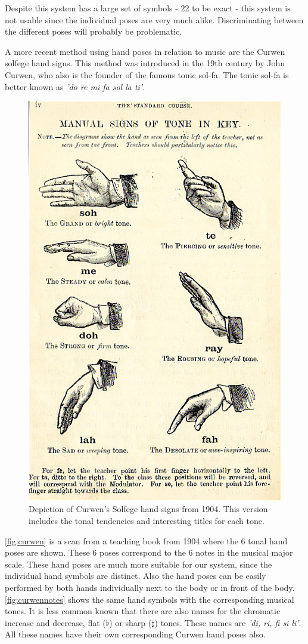 Despite this system has a large set of symbols - 22 to be exact - this system is not usable since the individual poses are very much alike. Discriminating between the different poses will probably be problematic.

A more recent method using hand poses in relation to music are the Curwen solfege hand signs\cite{choksy1999}. This method was introduced in the 19th century by John Curwen, who also is the founder of the famous tonic sol-fa. The tonic sol-fa is better known as \emph{'do re mi fa sol la ti'}.

\begin{figure}[htbp]
	\centering{}
	\includegraphics[width=0.6\linewidth]{figures/curwen.jpg}
	\caption{Depiction of Curwen's Solfege hand signs from 1904. This version includes the tonal tendencies and interesting titles for each tone.}
	\label{fig:curwen}
\end{figure}

\autoref{fig:curwen} is a scan from a teaching book from 1904 where the 6 tonal hand poses are shown. These 6 poses correspond to the 6 notes in the musical major scale. These hand poses are much more suitable for our system, since the individual hand symbols are distinct. Also the hand poses can be easily performed by both hands individually next to the body or in front of the body. \autoref{fig:curwennotes} shows the same hand symbols with the corresponding musical tones. It is less common known that there are also names for the chromatic increase and decrease, flat ($\flat$) or sharp ($\sharp$) tones. These names are \emph{'di, ri, fi si li'}. All these names have their own corresponding Curwen hand poses also.

